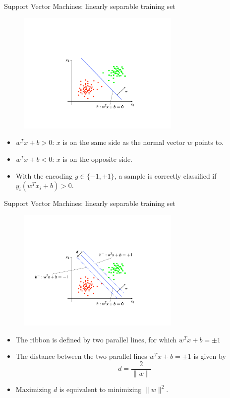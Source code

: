 \documentclass[xcolor=pdftex,dvipsnames,table]{beamer}
\begin{document}
\begin{frame}{Support Vector Machines: linearly separable training set}
	\begin{figure}[htb]
		\includegraphics[width=0.7\textwidth]{../graphics/SVM_1a.pdf}
	\end{figure}
	\begin{itemize}
		\item $w^Tx + b  > 0$: $x$ is on the same side as the normal vector $w$ points to.
		\item $w^Tx + b  < 0$: $x$ is on the opposite side.
		\item With the encoding $y\in\{-1,+1\}$, a sample is correctly classified if $y_i(w^Tx_i + b) > 0$.
	\end{itemize}
\end{frame}

\begin{frame}{Support Vector Machines: linearly separable training set}
	\begin{figure}[htb]
		\includegraphics[width=0.7\textwidth]{../graphics/SVM2.pdf}
	\end{figure}
	\begin{itemize}
		\item The ribbon is defined by two parallel lines, for which $w^Tx + b = \pm 1$ 
		\item The distance between the two parallel lines $w^Tx + b = \pm 1$ is given by
		\begin{equation}
			d = \frac{2}{\|w\|}
		\end{equation}
		\item Maximizing $d$ is equivalent to minimizing $\|w\|^2$.
	\end{itemize}
\end{frame}
\end{document}
